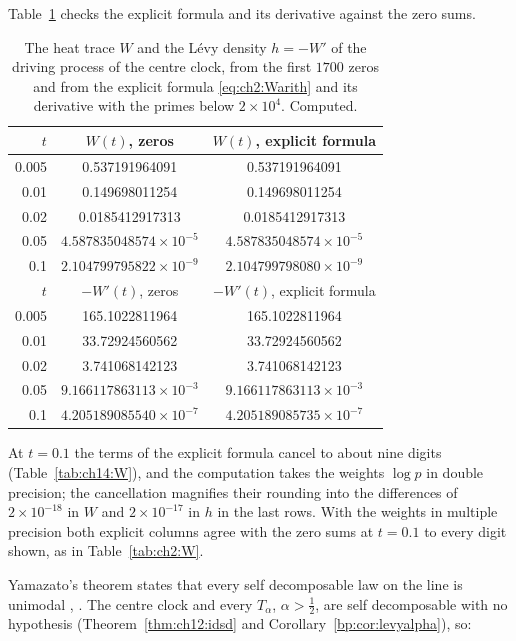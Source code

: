 Table~\ref{sb:tab:bdlp} checks the explicit formula and its derivative against the zero sums.

\begin{table}[htbp]
\centering\footnotesize
\setlength{\tabcolsep}{4pt}
\begin{tabular}{rcc}
\toprule
$t$ & $W(t)$, zeros & $W(t)$, explicit formula\\
\midrule
0.005 & 0.537191964091 & 0.537191964091\\
0.01 & 0.149698011254 & 0.149698011254\\
0.02 & 0.0185412917313 & 0.0185412917313\\
0.05 & $4.587835048574\times10^{-5}$ & $4.587835048574\times10^{-5}$\\
0.1 & $2.104799795822\times10^{-9}$ & $2.104799798080\times10^{-9}$\\
\midrule
$t$ & $-W'(t)$, zeros & $-W'(t)$, explicit formula\\
\midrule
0.005 & 165.1022811964 & 165.1022811964\\
0.01 & 33.72924560562 & 33.72924560562\\
0.02 & 3.741068142123 & 3.741068142123\\
0.05 & $9.166117863113\times10^{-3}$ & $9.166117863113\times10^{-3}$\\
0.1 & $4.205189085540\times10^{-7}$ & $4.205189085735\times10^{-7}$\\
\bottomrule
\end{tabular}
\caption{The heat trace $W$ and the L\'evy density $h=-W'$ of the driving process of the centre clock, from the first $1700$ zeros and from the explicit formula \eqref{eq:ch2:Warith} and its derivative with the primes below $2\times10^4$. Computed.}
\label{sb:tab:bdlp}
\end{table}

At $t=0.1$ the terms of the explicit formula cancel to about nine digits (Table~\ref{tab:ch14:W}), and the computation takes the weights $\log p$ in double precision; the cancellation magnifies their rounding into the differences of $2\times10^{-18}$ in $W$ and $2\times10^{-17}$ in $h$ in the last rows. With the weights in multiple precision both explicit columns agree with the zero sums at $t=0.1$ to every digit shown, as in Table~\ref{tab:ch2:W}.

Yamazato's theorem states that every self decomposable law on the line is unimodal \cite{Yamazato78}, \cite[Theorem 53.1]{Sato99}. The centre clock and every $T_\alpha$, $\alpha>\frac12$, are self decomposable with no hypothesis (Theorem~\ref{thm:ch12:idsd} and Corollary~\ref{bp:cor:levyalpha}), so:

